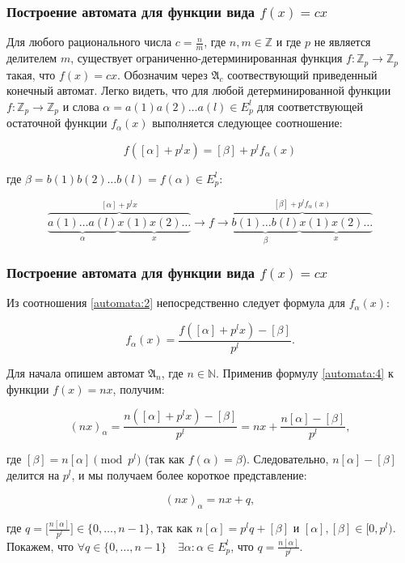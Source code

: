 \documentclass[10pt,utf8,presentation,compress]{beamer}
\begin{document}
\begin{frame}
\frametitle{Построение автомата для функции вида $f(x)=cx$}

Для любого рационального числа $c=\frac{n}{m}$, где $n,m \in \mathbb Z$ и где $p$ не является делителем $m$, существует ограниченно-детерминированная функция $f: \mathbb Z_p \rightarrow \mathbb Z_p$ такая, что $f(x)=cx$. Обозначим через $\mathfrak{A}_c$ соотвествующий приведенный конечный автомат. Легко видеть, что для любой детерминированной функции $f: \mathbb Z_p \rightarrow \mathbb Z_p$ и слова $\alpha=a(1)a(2)\ldots a(l) \in E^l_p$ для соответствующей остаточной функции $f_\alpha (x)$ выполняется следующее соотношение:

\begin{equation} \label{automata:2}
f([\alpha]+p^lx)=[\beta]+p^l f_{\alpha}(x)
\end{equation}

\noindent где $\beta=b(1)b(2)\ldots b(l) =f(\alpha) \in E^l_p$:

\begin{equation} \label{automata:3}
\overbrace{\underbrace{a(1)\ldots a(l)}_{\alpha} \underbrace{x(1)x(2)\ldots}_{x}}^{[\alpha]+p^{l}x} \rightarrow
\boxed{f} \rightarrow \overbrace{\underbrace{b(1)\ldots b(l)}_{\beta} \underbrace{x(1)x(2)\ldots}_{x}}^{[\beta]+p^{l}f_{\alpha}(x)}
\end{equation}
\end{frame}

\begin{frame}
\frametitle{Построение автомата для функции вида $f(x)=cx$}
\noindent Из соотношения \ref{automata:2} непосредственно следует формула для $f_{\alpha}(x)$:

\begin{equation} \label{automata:4}
f_{\alpha}(x)=\frac{f([\alpha]+p^{l}x)-[\beta]}{p^l}.
\end{equation}

\noindent Для начала опишем автомат $\mathfrak{A}_n$, где $n \in \mathbb N$. Применив формулу \ref{automata:4} к функции $f(x)=nx$, получим:

\begin{equation} \label{automata:5}
(nx)_{\alpha}=\frac{n([\alpha]+p^{l}x)-[\beta]}{p^l}	=nx+\frac{n[\alpha]-[\beta]}{p^l},
\end{equation}

\noindent где $[\beta]=n[\alpha] \pmod {p^l}$ (так как $f(\alpha)=\beta$). Следовательно, $n[\alpha]-[\beta]$ делится на $p^l$, и мы получаем более короткое представление:

\begin{equation} \label{automata:6}
(nx)_{\alpha}=nx+q,	
\end{equation}

\noindent где $q=\bigg[\frac{n[\alpha]}{p^l}\bigg] \in \{0, \ldots, n-1\}$, так как $n[\alpha]=p^l q+[\beta]$ и $[\alpha],[\beta] \in [0,p^l)$. Покажем, что $\forall q \in \{0, \ldots, n-1\} \quad \exists \alpha: \alpha \in E^l_p$, что  $q=\frac{n[\alpha]}{p^l}$.

\end{frame}
\end{document}
